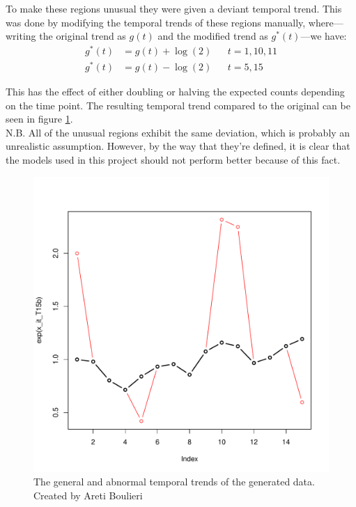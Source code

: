 \documentclass[11pt]{report}
\begin{document}
To make these regions unusual they were given a deviant temporal trend. This was done by modifying the temporal trends of these regions manually, where---writing the original trend as $g(t)$ and the modified trend as $g^*(t)$---we have:
\begin{align}
g^*(t) &= g(t) + \log(2) && t = 1, 10, 11 \\ 
g^*(t) &= g(t) - \log(2) && t = 5, 15
\end{align}

This has the effect of either doubling or halving the expected counts depending on the time point. The resulting temporal trend compared to the original can be seen in figure \ref{fig:timeeffects}. \\

 N.B. All of the unusual regions exhibit the same deviation, which is probably an unrealistic assumption. However, by the way that they're defined, it is clear that the models used in this project should not perform better because of this fact. 

\begin{figure}
\includegraphics[scale=0.5]{plot_time_effects}
\centering
\caption{The general and abnormal temporal trends of the generated data. Created by Areti Boulieri}
\label{fig:timeeffects}
\end{figure}
\end{document}
